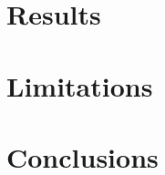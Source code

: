 \documentclass{article}
\begin{document}

\section{Results}\label{sec:results}


\section{Limitations}\label{sec:Limitations}


\section{Conclusions}\label{sec:conclusion}


\parencite{einstein_can_1935}
\newpage
\printbibliography
\appendix

\end{document}
